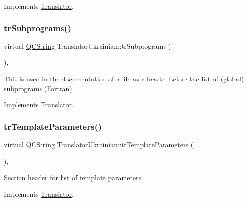Implements \mbox{\hyperlink{class_translator}{Translator}}.

\mbox{\label{class_translator_ukrainian_ad97a3d6df05a4dc0f6a5573164447d1c}} 
\subsubsection{\texorpdfstring{trSubprograms()}{trSubprograms()}}
{\footnotesize\ttfamily virtual \mbox{\hyperlink{class_q_c_string}{Q\+C\+String}} Translator\+Ukrainian\+::tr\+Subprograms (\begin{DoxyParamCaption}{ }\end{DoxyParamCaption})\hspace{0.3cm}{\ttfamily [inline]}, {\ttfamily [virtual]}}

This is used in the documentation of a file as a header before the list of (global) subprograms (Fortran). 

Implements \mbox{\hyperlink{class_translator}{Translator}}.

\mbox{\label{class_translator_ukrainian_afa432bd736d633ea09fd1cecc65740fe}} 
\subsubsection{\texorpdfstring{trTemplateParameters()}{trTemplateParameters()}}
{\footnotesize\ttfamily virtual \mbox{\hyperlink{class_q_c_string}{Q\+C\+String}} Translator\+Ukrainian\+::tr\+Template\+Parameters (\begin{DoxyParamCaption}{ }\end{DoxyParamCaption})\hspace{0.3cm}{\ttfamily [inline]}, {\ttfamily [virtual]}}

Section header for list of template parameters 

Implements \mbox{\hyperlink{class_translator}{Translator}}.

\mbox{\label{class_translator_ukrainian_aacfd1fe03cbc3c807e1b6e2542c85d94}} 

